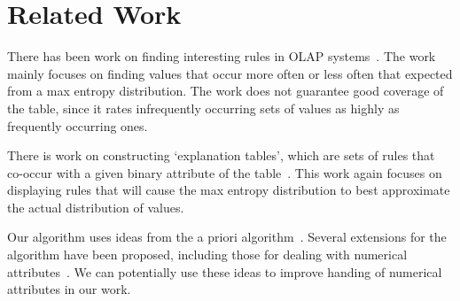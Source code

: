 \documentclass{sig-alternate}
\begin{document}

\section{Related Work}
There has been work on finding interesting rules in OLAP systems~\cite{Sarawagi:2001:UMA:767141.767148, Sarawagi00user-adaptiveexploration, Sarawagi98discovery-drivenexploration}. The work mainly focuses on finding values that occur more often or less often that expected from a max entropy distribution. The work does not guarantee good coverage of the table, since it rates infrequently occurring sets of values as highly as frequently occurring ones. 

There is work on constructing `explanation tables', which are sets of rules that co-occur with a given binary attribute of the table~\cite{DBLP:journals/pvldb/GebalyAGKS14}. This work again focuses on displaying rules that will cause the max entropy distribution to best approximate the actual distribution of values. 

Our algorithm uses ideas from the a priori algorithm~\cite{apriori}. Several extensions for the algorithm have been proposed, including those for dealing with numerical attributes~\cite{Srikant:1996:MQA:233269.233311}. We can potentially use these ideas to improve handing of numerical attributes in our work. 

{\small 


}
\end{document}
